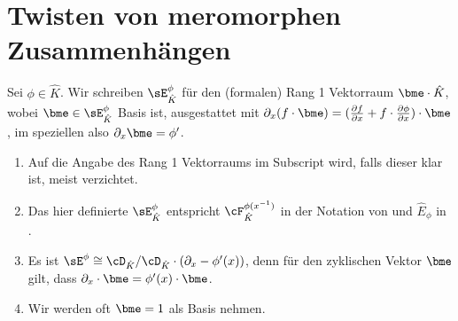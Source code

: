 \section{Twisten von meromorphen Zusammenhängen}
\begin{defn} \label{defn:rang1Vr}
Sei $\phi\in\hat K$.
Wir schreiben $\sE_{\hat K}^\phi$ für den (formalen) Rang 1 Vektorraum 
$\bme\cdot\hat K$, wobei $\bme\in\sE_{\hat K}^\phi$ Basis ist, ausgestattet
mit $\partial_x(f\cdot \bme) =(\frac{\partial f}{\partial
x}+f\cdot\frac{\partial\phi}{\partial x})\cdot\bme$, im speziellen also
$\partial_x\bme=\phi'$.
\begin{comment}
nach \cite[1.a]{sabbah_Fourier-local}
\end{comment}
\end{defn}
\begin{bem}
\begin{enumerate}
\item Auf die Angabe des Rang 1 Vektorraums im Subscript wird, falls dieser
klar ist, meist verzichtet.
\item Das hier definierte $\sE^{\phi}_{\hat K}$ entspricht
$\cF^{\phi(x^{-1})}_{\hat K}$ in der Notation von
\cite[5.4.4]{sabbah_cimpa90} und $\hat E_\phi$ in \cite[Def 5.8]{DiplHedwig}.
\item Es ist $\sE^\phi\cong\cD_{\hat K}/\cD_{\hat
K}\cdot(\partial_x-\phi'(x))$, denn für den zyklischen Vektor $\bme$ gilt, dass
$\partial_x \cdot \bme = \phi'(x) \cdot \bme$.
\item Wir werden oft $\bme=1$ als Basis nehmen.
\end{enumerate}
\end{bem}

